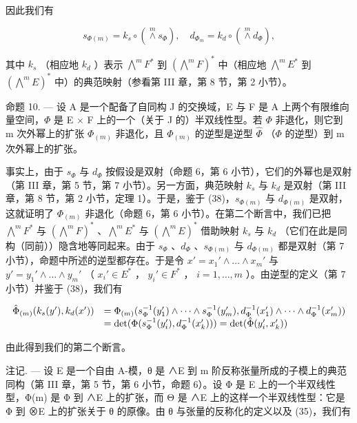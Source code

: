 因此我们有

\[
s _ {\Phi (m)} = k _ {s} \circ (\stackrel {m} {\wedge} s _ {\Phi}), \quad d _ {\Phi_ {m}} = k _ {d} \circ (\stackrel {m} {\wedge} d _ {\Phi}),\tag{38}
\]

其中 \(k_s\) （相应地 \(k_d\) ）表示 \(\bigwedge^m F^*\) 到 \((\bigwedge^m F)^*\) 中（相应地 \(\bigwedge^m E^*\) 到 \((\bigwedge^m E)^*\) 中）的典范映射（参看第 III 章，第 8 节，第 2 小节）。

命题 10. --- 设 A 是一个配备了自同构 J 的交换域，E 与 F 是 A 上两个有限维向量空间，\(\Phi\) 是 E \(\times\) F 上的一个（关于 J 的）半双线性型。若 \(\Phi\) 非退化，则它到 m 次外幂上的扩张 \(\Phi_{(m)}\) 非退化，且 \(\Phi_{(m)}\) 的逆型是逆型 \(\hat{\Phi}\) （\(\Phi\) 的逆型）到 m 次外幂上的扩张。

事实上，由于 \(s_{\Phi}\) 与 \(d_{\Phi}\) 按假设是双射（命题 6，第 6 小节），它们的外幂也是双射（第 III 章，第 5 节，第 7 小节）。另一方面，典范映射 \(k_s\) 与 \(k_d\) 是双射（第 III 章，第 8 节，第 2 小节，定理 1）。于是，鉴于 (38)，\(s_{\Phi(m)}\) 与 \(d_{\Phi(m)}\) 是双射，这就证明了 \(\Phi_{(m)}\) 非退化（命题 6，第 6 小节）。在第二个断言中，我们已把 \(\bigwedge^m F^*\) 与 \((\bigwedge^m F)^*\) 、\(\bigwedge^m E^*\) 与 \((\bigwedge^m E)^*\) 借助映射 \(k_s\) 与 \(k_d\) （它们在此是同构（同前））隐含地等同起来。由于 \(s_{\Phi}\) 、\(d_{\Phi}\) 、\(s_{\Phi(m)}\) 与 \(d_{\Phi(m)}\) 都是双射（第 7 小节），命题中所述的逆型都存在。于是令 \(x' = x_1' \wedge \ldots \wedge x_m'\) 与 \(y' = y_1' \wedge \ldots \wedge y_m'\) （ \(x_i' \in E^*\) ， \(y_i' \in F^*\) ， \(i = 1, \ldots, m\) ）。由逆型的定义（第 7 小节）并鉴于 (38)，我们有

\[
\begin{array}{r l} \hat {\Phi} _ {(m)} (k _ {s} (y ^ {\prime}), k _ {d} (x ^ {\prime})) & = \Phi_ {(m)} (s _ {\Phi} ^ {- 1} (y _ {1} ^ {\prime}) \wedge \dots \wedge s _ {\Phi} ^ {- 1} (y _ {m} ^ {\prime}), d _ {\Phi} ^ {- 1} (x _ {1} ^ {\prime}) \wedge \dots \wedge d _ {\Phi} ^ {- 1} (x _ {m} ^ {\prime})) \\ & = \det (\Phi (s _ {\Phi} ^ {- 1} (y _ {i} ^ {\prime}), d _ {\Phi} ^ {- 1} (x _ {k} ^ {\prime}))) = \det (\hat {\Phi} (y _ {i} ^ {\prime}, x _ {k} ^ {\prime})) \end{array}
\]

由此得到我们的第二个断言。

注记. --- 设 E 是一个自由 A-模，θ 是 ∧E 到 m 阶反称张量所成的子模上的典范同构（第 III 章，第 5 节，第 6 小节，命题 6）。设 Φ 是 E 上的一个半双线性型，Φ(m) 是 Φ 到 ∧E 上的扩张，而 Θ 是 ∧E 上的这样一个半双线性型：它是 Φ 到 ⊗E 上的扩张关于 θ 的原像。由 θ 与张量的反称化的定义以及 (35)，我们有

